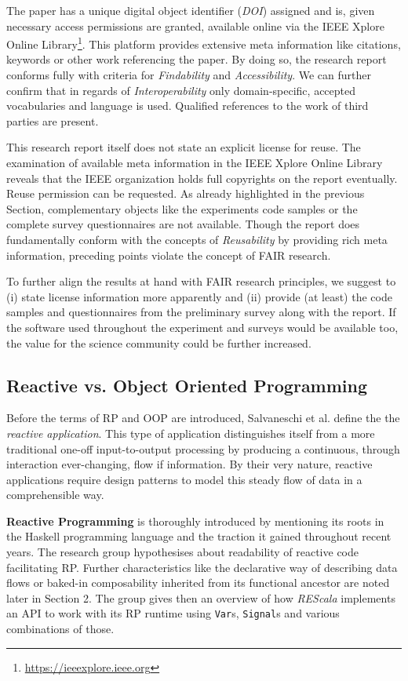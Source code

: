 \documentclass[12pt,a4paper]{article}
\begin{document}
The paper has a unique digital object identifier (\emph{DOI}) assigned and is, given necessary access permissions are granted, available online via the IEEE Xplore Online Library\footnote{\url{https://ieeexplore.ieee.org}}. This platform provides extensive meta information like citations, keywords or other work referencing the paper. By doing so, the research report conforms fully with criteria for \emph{Findability} and \emph{Accessibility}. We can further confirm that in regards of \emph{Interoperability} only domain-specific, accepted vocabularies and language is used. Qualified references to the work of third parties are present.

This research report itself does not state an explicit license for reuse. The examination of available meta information in the IEEE Xplore Online Library reveals that the IEEE organization holds full copyrights on the report eventually. Reuse permission can be requested. As already highlighted in the previous Section, complementary objects like the experiments code samples or the complete survey questionnaires are not available. Though the report does fundamentally conform with the concepts of \emph{Reusability} by providing rich meta information, preceding points violate the concept of FAIR research.

To further align the results at hand with FAIR research principles, we suggest to (i) state license information more apparently and (ii) provide (at least) the code samples and questionnaires from the preliminary survey along with the report. If the software used throughout the experiment and surveys would be available too, the value for the science community could be further increased.

\subsection{Reactive vs. Object Oriented Programming}

Before the terms of RP and OOP are introduced, Salvaneschi et al. define the the \emph{reactive application}. This type of application distinguishes itself from a more traditional one-off input-to-output processing by producing a continuous, through interaction ever-changing, flow if information. By their very nature, reactive applications require design patterns to model this steady flow of data in a comprehensible way.

\textbf{Reactive Programming} is thoroughly introduced by mentioning its roots in the Haskell programming language and the traction it gained throughout recent years. The research group hypothesises about readability of reactive code facilitating RP. Further characteristics like the declarative way of describing data flows or baked-in composability inherited from its functional ancestor are noted later in Section 2. The group gives then an overview of how \emph{REScala} implements an API to work with its RP runtime using \texttt{Var}s, \texttt{Signal}s and various combinations of those.
\end{document}

